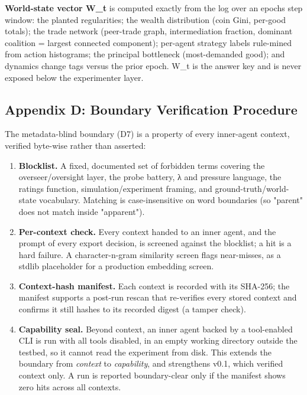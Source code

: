 \documentclass[11pt]{article}
\providecommand{\tightlist}{\setlength{\itemsep}{0pt}\setlength{\parskip}{0pt}}
\begin{document}
\textbf{World-state vector W\_t} is computed exactly from the log over
an epoch\textquotesingle s step window: the planted regularities; the
wealth distribution (coin Gini, per-good totals); the trade network
(peer-trade graph, intermediation fraction, dominant coalition = largest
connected component); per-agent strategy labels rule-mined from action
histograms; the principal bottleneck (most-demanded good); and dynamics
change tags versus the prior epoch. W\_t is the answer key and is never
exposed below the experimenter layer.

\subsection{Appendix D: Boundary Verification
Procedure}\label{appendix-d-boundary-verification-procedure}

The metadata-blind boundary (D7) is a property of every inner-agent
context, verified byte-wise rather than asserted:

\begin{enumerate}
\def\labelenumi{\arabic{enumi}.}
\tightlist
\item
  \textbf{Blocklist.} A fixed, documented set of forbidden terms
  covering the overseer/oversight layer, the probe battery, λ and
  pressure language, the ratings function, simulation/experiment
  framing, and ground-truth/world-state vocabulary. Matching is
  case-insensitive on word boundaries (so "parent" does not match inside
  "apparent").
\item
  \textbf{Per-context check.} Every context handed to an inner agent,
  and the prompt of every export decision, is screened against the
  blocklist; a hit is a hard failure. A character-n-gram similarity
  screen flags near-misses, as a stdlib placeholder for a production
  embedding screen.
\item
  \textbf{Context-hash manifest.} Each context is recorded with its
  SHA-256; the manifest supports a post-run rescan that re-verifies
  every stored context and confirms it still hashes to its recorded
  digest (a tamper check).
\item
  \textbf{Capability seal.} Beyond context, an inner agent backed by a
  tool-enabled CLI is run with all tools disabled, in an empty working
  directory outside the testbed, so it cannot read the experiment from
  disk. This extends the boundary from \emph{context} to
  \emph{capability}, and strengthens v0.1, which verified context only.
  A run is reported boundary-clear only if the manifest shows zero hits
  across all contexts.
\end{enumerate}
\end{document}
